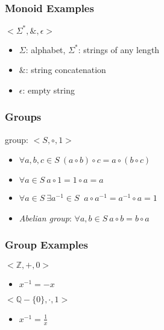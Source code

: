 \documentclass[dvipsnames]{beamer}
\begin{document}
\begin{frame}
  \frametitle{Monoid Examples}

  \begin{example}
    $<\Sigma^*,\&,\epsilon>$

    \begin{itemize}
      \item $\Sigma$: alphabet, $\Sigma^*$: strings of any length
      \item $\&$: string concatenation
      \item $\epsilon$: empty string
    \end{itemize}
  \end{example}
\end{frame}

\begin{frame}
  \frametitle{Groups}

  \begin{definition}
    \alert{group}: $<S,\circ,1>$

    \begin{itemize}
      \item $\forall a,b,c \in S~(a \circ b) \circ c = a \circ (b \circ c)$
      \item $\forall a \in S~a \circ 1 = 1 \circ a = a$
      \item $\forall a \in S~\exists a^{-1} \in S~$
        $a \circ a^{-1} = a^{-1} \circ a = 1$

      \pause
      \medskip
      \item \emph{Abelian group}: $\forall a,b \in S~a \circ b = b \circ a$
    \end{itemize}
  \end{definition}
\end{frame}

\begin{frame}
  \frametitle{Group Examples}

  \begin{example}
    $<\mathbb{Z},+,0>$

    \begin{itemize}
      \item $x^{-1} = -x$
    \end{itemize}
  \end{example}

  \pause
  \begin{example}
    $<\mathbb{Q}-\{0\},\cdot,1>$

    \begin{itemize}
      \item $x^{-1} = \frac{1}{x}$
    \end{itemize}
  \end{example}
\end{frame}
\end{document}

